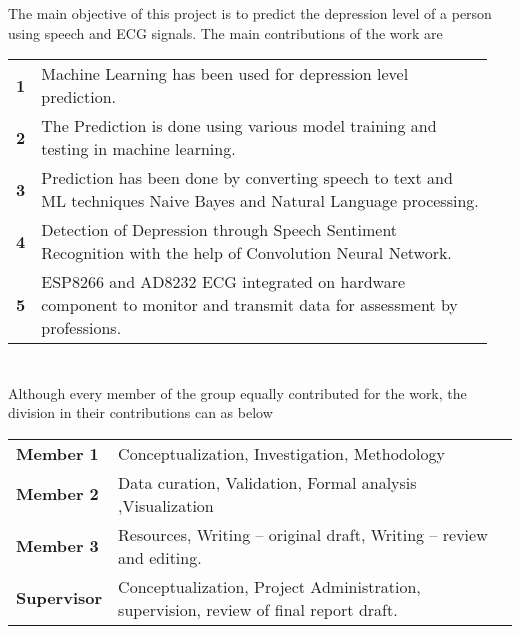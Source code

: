 \section*{}
\noindent
The main objective of this project is to predict the  depression level of a person using speech and ECG signals. The main contributions of the work are 
\newline
\vspace{5cm}
\begin{tabular}{p{0.01\linewidth}p{0.94\linewidth}}
\textbf{1} &Machine Learning  has been used for depression level prediction.
\\
\textbf{2} &The Prediction is done using various model training and testing in machine learning. 
 \\
\textbf{3} & Prediction has been done by converting speech to text and ML techniques Naive Bayes and Natural Language processing.
\\
\textbf{4} & Detection of Depression through Speech Sentiment Recognition with the help of Convolution Neural Network.
\\
\textbf{5} & ESP8266 and AD8232 ECG integrated on hardware component to monitor and transmit data for assessment by professions.
\end{tabular}
\section*{}
\noindent
Although every member of the group equally contributed for the work, the division in their contributions can as below 
\newline
\begin{tabular}{p{0.15\linewidth}p{0.85\linewidth}}
\textbf{ Member 1} & Conceptualization, Investigation, Methodology	\\
\textbf{ Member 2} &Data curation, Validation, Formal analysis	,Visualization 
 \\
\textbf{ Member 3} & Resources, Writing – original draft, Writing – review and editing.
 \\
\textbf{ Supervisor} & Conceptualization, Project Administration, supervision, review of final report draft.
\end{tabular}
